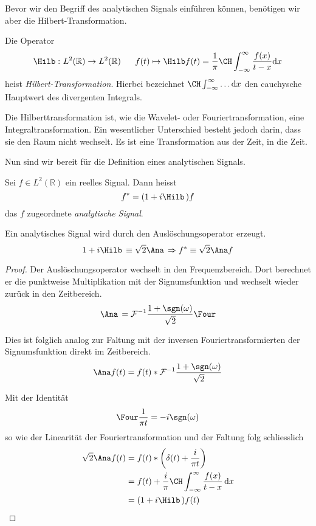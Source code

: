 Bevor wir den Begriff des analytischen Signals einführen können, benötigen wir aber die Hilbert-Transformation.
\begin{definition}
	Die Operator
 	\[
 	\Hilb\,\colon L^2(\mathbb R) \to L^2(\mathbb R)
 	~\quad~
 	f(t) \mapsto \Hilb f(t)
 	= \frac{1}{\pi} \CH\int_{-\infty}^{\infty}\frac{f(x)}{t-x} \mathrm{d}x
 	\]
 	heist \emph{Hilbert-Transformation}.
 	Hierbei bezeichnet $\CH\int_{-\infty}^{\infty} \dots \mathrm{d}x$ den cauchysche Hauptwert des divergenten Integrals.
\end{definition}

Die Hilberttransformation ist, wie die Wavelet- oder Fouriertransformation, eine Integraltransformation.
Ein wesentlicher Unterschied besteht jedoch darin, dass sie den Raum nicht wechselt.
Es ist eine Transformation aus der Zeit, in die Zeit.

Nun sind wir bereit für die Definition eines analytischen Signals.
\begin{definition}
	\label{complex:analytic-signal}
	Sei $f \in L^2(\mathbb R)$ ein reelles Signal.
	Dann heisst
	\[f^\ast = (1 + i\Hilb\,)f \]
	das $f$ zugeordnete \emph{analytische Signal}.
\end{definition}
\begin{satz}
	Ein analytisches Signal wird durch den Auslöschungsoperator erzeugt.
	\[1 + i\Hilb\, \equiv \sqrt 2 \Ana\, \Rightarrow f^\ast \equiv \sqrt 2 \Ana f\]
\end{satz}

\begin{proof}
	Der Auslöschungsoperator wechselt in den Frequenzbereich.
	Dort berechnet er die punktweise Multiplikation mit der Signumsfunktion und wechselt wieder zurück in den Zeitbereich.
	\[\Ana\, = \mathcal{F}^{-1}\frac{1+\sgn(\omega)}{\sqrt 2}\Four\]
	
	Dies ist folglich analog zur Faltung mit der inversen Fouriertransformierten der Signumsfunktion direkt im Zeitbereich.
	\[ \Ana f(t) = f(t) * \mathcal{F}^{-1}\frac{1 + \sgn(\omega)}{\sqrt 2} \]
	
	Mit der Identität
	\[\Four\frac{1}{\pi t} = -i\sgn(\omega)\]
	so wie der Linearität der Fouriertransformation und der Faltung folg schliesslich
	\begin{align*}
		\sqrt 2 \Ana f(t) 
		&= f(t) * \biggl(\delta(t) + \frac{i}{\pi t} \biggr)\\
		&= f(t) + \frac{i}{\pi} \CH\int_{-\infty}^{\infty} \frac{f(x)}{t - x} \,\mathrm{d}x\\
		&= (1 + i\Hilb\,) f(t)\qedhere
	\end{align*}
\end{proof}

